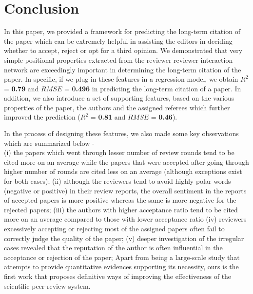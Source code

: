 \section{Conclusion}
\label{conclusion}

In this paper, we provided a framework for predicting the long-term citation of the paper which can be extremely helpful in assisting the editors in deciding whether to accept, reject or opt for a third opinion. We demonstrated that very simple positional properties extracted from the reviewer-reviewer interaction network are exceedingly important in determining the long-term citation of the paper. In specific, if we plug in these features in a regression model, we obtain $R^2$ = \textbf{0.79} and $RMSE$ = \textbf{0.496} in predicting the long-term citation of a paper. In addition, we also introduce a set of supporting features, based on the various properties of the paper, the authors and the assigned referees which further improved the prediction ($R^2$ = \textbf{0.81} and $RMSE$ = \textbf{0.46}). 

In the process of designing these features, we also made some key observations which are summarized below - \\ 
(i) the papers which went through lesser number of review rounds tend to be cited more on an average while the papers that were accepted after going through higher number of rounds are cited less on an average (although exceptions exist for both cases); 
(ii) although the reviewers tend to avoid highly polar words (negative or positive) in their review reports, the overall sentiment in the reports of accepted papers is more positive whereas the same is more negative for the rejected papers; 
(iii) the authors with higher acceptance ratio tend to be cited more on an average compared to those with lower acceptance ratio 
(iv) reviewers excessively accepting or rejecting most of the assigned papers often fail to correctly judge the quality of the paper;
(v) deeper investigation of the irregular cases revealed that the reputation of the author is often influential in the acceptance or rejection of the paper;
Apart from being a large-scale study that attempts to provide quantitative evidences supporting its necessity, ours is the first work that proposes definitive ways of improving the effectiveness of the scientific peer-review system.  

\medskip 